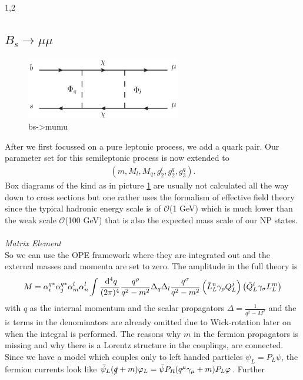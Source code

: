 \documentclass[11pt,a4paper,twoside]{article}
\numberwithin{equation}{section}
\newcommand{\ti}{\text{i}}
\begin{document}
\begin{spacing}{1,2}
\subsection{$B_s\rightarrow \mu\mu$}
\begin{figure}[t]
 \includegraphics[width=0.6\textwidth]{../pics/bsmumu.eps}
 \caption{bs->mumu}
 \label{pic_Bsmumu}
\end{figure}
After we first focussed on a pure leptonic process, we add a quark pair. Our parameter set for this semileptonic process is now extended to
\begin{align}
 \left(m, M_l, M_q, g_2^l, g_2^q, g_3^q\right).
\end{align}
Box diagrams of the kind as in picture \ref{pic_Bsmumu} are usually not calculated 
all the way down to cross sections but one rather uses the formalism of effective field theory since the typical hadronic energy scale is of
$\mathcal{O}$(1 GeV) which is much lower than the weak scale $\mathcal{O}$(100 GeV) that is also the expected mass scale of our NP states. 
\\ \\ \noindent \textit{Matrix Element}\\
\noindent So we can use 
the OPE framework where they are integrated out and the external masses and momenta are set to zero. The amplitude in the full theory is
\begin{align}
 M =\alpha_i^{q*} \alpha_j^{q*} \alpha_m^l \alpha_n^l\int \frac{\; \mathrm{d}^4 q}{(2\pi)^4} \frac{q^\rho}{q^2-m^2}\Delta_q \Delta_l \frac{q^\sigma}{q^2-m^2} \left(\bar L_L^n \gamma_\rho Q_L^j\right) \left(\bar Q_L^i \gamma_\sigma L_L^m\right)
 \label{eq_matElemBSmumu}
\end{align}
with $q$ as the internal momentum and the scalar propagators $\Delta = \frac{1}{q^2-M^2}$ and the $\ti\epsilon$ terms in the denominators are already omitted
due to Wick-rotation later on when the integral is performed. The reasons why $m$ in the fermion propagators is missing
and why there is a Lorentz structure in the couplings, are connected. Since we have a model which couples only to left handed particles $\psi_L = P_L \psi$,
the fermion currents look like $\bar \psi_L (\slashed{q}+m)\varphi_L = \bar \psi P_R (q^\mu \gamma_\mu+m) P_L\varphi$. Further

\end{spacing}
\end{document}

